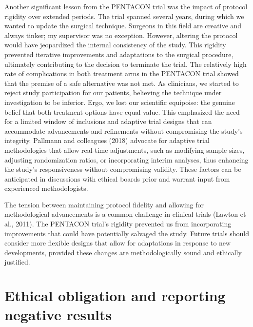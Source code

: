\documentclass[authordate, reflection,issue]{jote-new-article}
\begin{document}
	Another significant lesson from the PENTACON trial was the impact of protocol rigidity over extended periods. The trial spanned several years, during which we wanted to update the surgical technique. Surgeons in this field are creative and always tinker; my supervisor was no exception. However, altering the protocol would have jeopardized the internal consistency of the study. This rigidity prevented iterative improvements and adaptations to the surgical procedure, ultimately contributing to the decision to terminate the trial. The relatively high rate of complications in both treatment arms in the PENTACON trial showed that the premise of a safe alternative was not met. As clinicians, we started to reject study participation for our patients, believing the technique under investigation to be inferior. Ergo, we lost our scientific equipoise: the genuine belief that both treatment options have equal value. This emphasized the need for a limited window of inclusions and adaptive trial designs that can accommodate advancements and refinements without compromising the study's integrity. Pallmann and colleagues (2018) advocate for adaptive trial methodologies that allow real-time adjustments, such as modifying sample sizes, adjusting randomization ratios, or incorporating interim analyses, thus enhancing the study's responsiveness without compromising validity. These factors can be anticipated in discussions with ethical boards prior and warrant input from experienced methodologists.



	The tension between maintaining protocol fidelity and allowing for methodological advancements is a common challenge in clinical trials (Lawton et al., 2011). The PENTACON trial's rigidity prevented us from incorporating improvements that could have potentially salvaged the study. Future trials should consider more flexible designs that allow for adaptations in response to new developments, provided these changes are methodologically sound and ethically justified.



	\section{Ethical obligation and reporting negative results}
\end{document}

